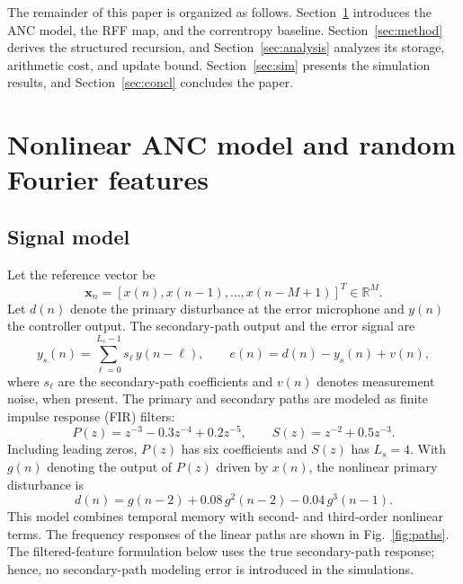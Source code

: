 \documentclass[preprint,12pt]{elsarticle}
\begin{document}
The remainder of this paper is organized as follows. Section~\ref{sec:model} introduces the ANC model, the RFF map, and the correntropy baseline. Section~\ref{sec:method} derives the structured recursion, and Section~\ref{sec:analysis} analyzes its storage, arithmetic cost, and update bound. Section~\ref{sec:sim} presents the simulation results, and Section~\ref{sec:concl} concludes the paper.

\section{Nonlinear ANC model and random Fourier features}\label{sec:model}

\subsection{Signal model}

Let the reference vector be
\begin{equation}
\mathbf{x}_n = [x(n), x(n-1), \ldots, x(n-M+1)]^T \in \mathbb{R}^M .
\end{equation}
Let $d(n)$ denote the primary disturbance at the error microphone and $y(n)$ the controller output. The secondary-path output and the error signal are
\begin{equation}\label{eq:err}
y_s(n) = \sum_{\ell=0}^{L_s-1} s_\ell\, y(n-\ell), \qquad e(n) = d(n) - y_s(n) + v(n),
\end{equation}
where $s_\ell$ are the secondary-path coefficients and $v(n)$ denotes measurement noise, when present. The primary and secondary paths are modeled as finite impulse response (FIR) filters:
\begin{equation}\label{eq:paths}
P(z) = z^{-3} - 0.3z^{-4} + 0.2z^{-5}, \qquad S(z) = z^{-2} + 0.5z^{-3}.
\end{equation}
Including leading zeros, $P(z)$ has six coefficients and $S(z)$ has $L_s=4$. With $g(n)$ denoting the output of $P(z)$ driven by $x(n)$, the nonlinear primary disturbance is
\begin{equation}\label{eq:nl}
d(n) = g(n-2) + 0.08\,g^2(n-2) - 0.04\,g^3(n-1).
\end{equation}
This model combines temporal memory with second- and third-order nonlinear terms. The frequency responses of the linear paths are shown in Fig.~\ref{fig:paths}. The filtered-feature formulation below uses the true secondary-path response; hence, no secondary-path modeling error is introduced in the simulations.
\end{document}
